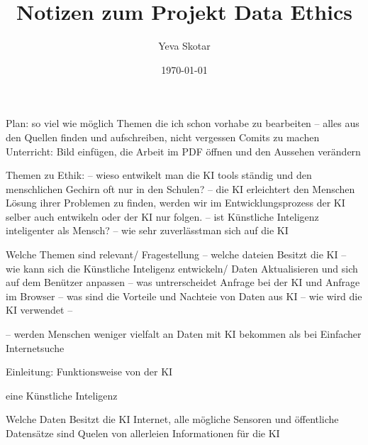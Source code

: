\documentclass{article}
\title{Notizen zum Projekt Data Ethics}
\author{Yeva Skotar}
\date{\today}
\begin{document}
\maketitle


\tableofcontents



Plan:
so viel wie möglich Themen die ich schon vorhabe zu bearbeiten -- alles aus den Quellen finden und aufschreiben, 
nicht vergessen Comits zu machen 
Unterricht:
Bild einfügen, die Arbeit im PDF öffnen und den Aussehen verändern 

Themen zu Ethik:
-- wieso entwikelt man die KI tools ständig und den menschlichen Gechirn oft nur in den Schulen?
-- die KI erleichtert den Menschen Lösung ihrer Problemen zu finden, werden wir im Entwicklungsprozess der KI 
selber auch entwikeln oder der KI nur folgen.
-- ist Künstliche Inteligenz inteligenter als Mensch?
-- wie sehr zuverlässtman sich auf die KI

Welche Themen sind relevant/ Fragestellung
-- welche dateien Besitzt die KI
-- wie kann sich die Künstliche Inteligenz entwickeln/ Daten Aktualisieren und sich auf dem Benützer anpassen 
-- was untrerscheidet Anfrage bei der KI und Anfrage im Browser 
-- was sind die Vorteile und Nachteie von Daten aus KI 
-- wie wird die KI verwendet
--  

-- werden Menschen weniger vielfalt an Daten mit KI bekommen als bei Einfacher Internetsuche 

Einleitung: Funktionsweise von der KI 


eine Künstliche Inteligenz 

Welche Daten Besitzt die KI 
Internet, alle mögliche Sensoren und öffentliche Datensätze sind Quelen von allerleien Informationen 
für die KI 
\end{document}
